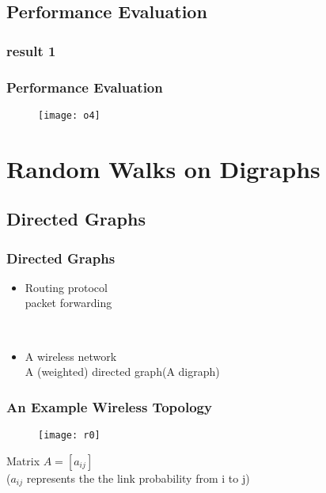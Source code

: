 \documentclass[xcolor=dvipsnames]{beamer}
\begin{document}
\subsection{Performance Evaluation}
\subsubsection{result 1}
\begin{frame}
\frametitle{Performance Evaluation}
\begin{figure}
\begin{center}
  \texttt{[image: o4]}
\end{center}
\end{figure}
\end{frame}

\section{Random Walks on Digraphs}
\subsection{Directed Graphs}
\begin{frame}
\frametitle{Directed Graphs}
\begin{itemize}
\item<1->
\begin{center}
Routing protocol\\
packet forwarding
\end{center}
\indent \\

\item<2->
\begin{center}
A wireless network\\ 
A (weighted) directed graph(A digraph)
\end{center}
\end{itemize}
\end{frame}

\begin{frame}
\frametitle{An Example Wireless Topology}
\begin{figure}
\begin{center}
  \texttt{[image: r0]}
\end{center}
\end{figure}
Matrix $A=[a_{ij}]$ \\
($a_{ij}$ represents the the link probability from i to j)
\end{frame}
\end{document}
